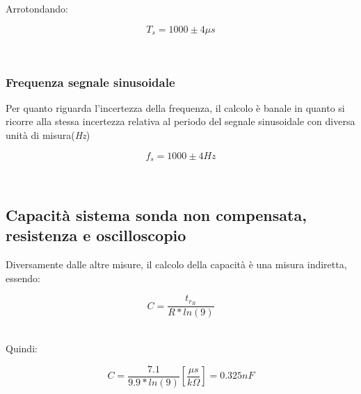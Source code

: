 \documentclass[a4paper]{article}
\begin{document}
Arrotondando: 

\begin{Large}
	\begin{equation}
		{T_s}= 1000 \pm 4\mu s 
	\end{equation}
\end{Large}\\


\subsubsection{Frequenza segnale sinusoidale}
%
Per quanto riguarda l'incertezza della frequenza, il calcolo è banale in quanto si ricorre alla stessa incertezza relativa al periodo del segnale sinusoidale con diversa unità di misura(\emph{Hz})
\begin{Large}
	\begin{equation}
  		{f_s}= 1000\pm 4Hz
	\end{equation}
\end{Large}\\

\subsection{Capacità sistema sonda non compensata, resistenza e oscilloscopio}
Diversamente dalle altre misure, il calcolo della capacità è una misura indiretta, essendo: 
\begin{Large}
	\begin{equation}
  		C= \frac{t_{r_R}}{R*ln(9)}
	\end{equation}
\end{Large}\\

Quindi:
\begin{Large}
	\begin{equation}
  		C= \frac{7.1}{9.9*ln(9)} [\frac{\mu s}{k\Omega}]= 0.325nF
	\end{equation}
\end{Large}\\
\end{document}
